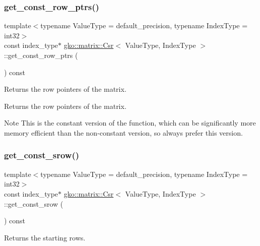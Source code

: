 \subsubsection{\texorpdfstring{get\+\_\+const\+\_\+row\+\_\+ptrs()}{get\_const\_row\_ptrs()}}
{\footnotesize\ttfamily template$<$typename Value\+Type = default\+\_\+precision, typename Index\+Type = int32$>$ \\
const index\+\_\+type$\ast$ \hyperlink{classgko_1_1matrix_1_1Csr}{gko\+::matrix\+::\+Csr}$<$ Value\+Type, Index\+Type $>$\+::get\+\_\+const\+\_\+row\+\_\+ptrs (\begin{DoxyParamCaption}{ }\end{DoxyParamCaption}) const\hspace{0.3cm}{\ttfamily [noexcept]}}



Returns the row pointers of the matrix. 

\begin{DoxyReturn}{Returns}
the row pointers of the matrix.
\end{DoxyReturn}
\begin{DoxyNote}{Note}
This is the constant version of the function, which can be significantly more memory efficient than the non-\/constant version, so always prefer this version. 
\end{DoxyNote}
\mbox{\label{classgko_1_1matrix_1_1Csr_ac046f27c47848bf31c9234567661ef48}} 
\subsubsection{\texorpdfstring{get\+\_\+const\+\_\+srow()}{get\_const\_srow()}}
{\footnotesize\ttfamily template$<$typename Value\+Type = default\+\_\+precision, typename Index\+Type = int32$>$ \\
const index\+\_\+type$\ast$ \hyperlink{classgko_1_1matrix_1_1Csr}{gko\+::matrix\+::\+Csr}$<$ Value\+Type, Index\+Type $>$\+::get\+\_\+const\+\_\+srow (\begin{DoxyParamCaption}{ }\end{DoxyParamCaption}) const\hspace{0.3cm}{\ttfamily [noexcept]}}



Returns the starting rows. 

